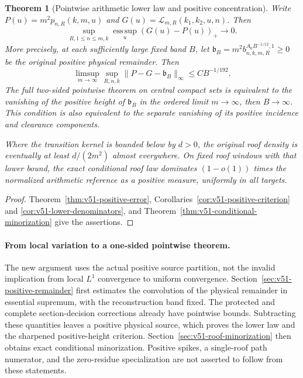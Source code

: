 \documentclass[11pt,reqno]{amsart}
\numberwithin{equation}{section}
\newtheorem{leadtheorem}{Theorem}
\theoremstyle{definition}\newtheorem{definition}[theorem]{Definition}
\theoremstyle{remark}\newtheorem{remark}[theorem]{Remark}
\begin{document}
\begin{leadtheorem}[Pointwise arithmetic lower law and positive concentration]
\label{thm:intro-v51-lower}
Write $P(u)=m^2p_{n,R}(k,m,u)$ and
$G(u)=\mathcal L_{m,R}(k_1,k_2,u,n)$. Then
\[
 \sup_{R,1\le n\le m,k}\operatorname*{ess\,sup}_u(G(u)-P(u))_+
                                                       \longrightarrow0.
\]
More precisely, at each sufficiently large fixed band $B$, let
$\mathfrak b_B=m^2b^{A_0B^{-1/12},1}_{n,k,m,R}\ge0$ be the
original positive physical remainder. Then
\[
 \limsup_{m\to\infty}\sup_{R,n,k}
                  \|P-G-\mathfrak b_B\|_\infty\le CB^{-1/192}.
\]
The full two-sided pointwise theorem on central compact sets is
equivalent to the vanishing of the positive height of $\mathfrak b_B$
in the ordered limit $m\to\infty$, then $B\to\infty$.
This condition is also equivalent to the separate vanishing of its
positive incidence and clearance components.

Where the transition kernel is bounded below by $d>0$, the original
roof density is eventually at least $d/(2m^2)$ almost everywhere.
On fixed roof windows with that lower bound, the exact conditional
roof law dominates $(1-o(1))$ times the normalized arithmetic reference
as a positive measure, uniformly in all targets.
\end{leadtheorem}
\begin{proof}
Theorem~\ref{thm:v51-positive-error},
Corollaries~\ref{cor:v51-positive-criterion} and
\ref{cor:v51-lower-denominators}, and
Theorem~\ref{thm:v51-conditional-minorization} give the assertions.
\end{proof}

\paragraph{From local variation to a one-sided pointwise theorem.}
The new argument uses the actual positive source partition, not the
invalid implication from local $L^1$ convergence to uniform convergence.
Section~\ref{sec:v51-positive-remainder} first estimates the convolution
of the physical remainder in essential supremum, with the reconstruction
band fixed. The protected and complete section-decision corrections
already have pointwise bounds. Subtracting these quantities leaves a
positive physical source, which proves the lower law and the sharpened
positive-height criterion. Section~\ref{sec:v51-roof-minorization}
then obtains exact conditional minorization. Positive spikes, a
single-roof path numerator, and the zero-residue specialization are not
asserted to follow from these statements.
\end{document}
